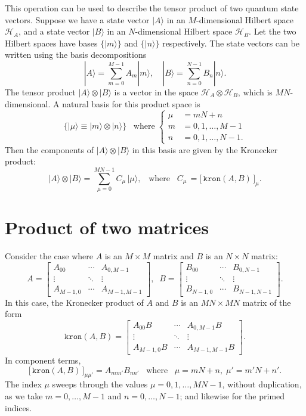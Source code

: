 \documentclass[pra,12pt]{revtex4}
\begin{document}
This operation can be used to describe the tensor product of two
quantum state vectors.  Suppose we have a state vector $|A\rangle$ in
an $M$-dimensional Hilbert space $\mathscr{H}_A$, and a state vector
$|B\rangle$ in an $N$-dimensional Hilbert space $\mathscr{H}_B$.  Let
the two Hilbert spaces have bases $\{|m\rangle\}$ and $\{|n\rangle\}$
respectively.  The state vectors can be written using the basis
decompositions
$$|A\rangle = \sum_{m=0}^{M-1} A_m |m\rangle, \quad |B\rangle = \sum_{n=0}^{N-1} B_n |n\rangle.$$
The tensor product $|A\rangle\otimes|B\rangle$ is a vector in the
space $\mathscr{H}_A\otimes \mathscr{H}_B$, which is $MN$-dimensional.
A natural basis for this product space is
$$\Big\{|\mu\rangle \equiv |m\rangle\otimes |n\rangle\Big\} \;\;\;\mathrm{where} \;\begin{cases}\mu\!\!\!\! &= mN+n \\ m \!\!\!\!&= 0,1,\dots,M-1 \\ n \!\!\!\!&= 0,1, \dots, N-1.\end{cases}$$
Then the components of $|A\rangle\otimes|B\rangle$ in this basis are
given by the Kronecker product:
$$|A\rangle\otimes|B\rangle = \sum_{\mu=0}^{MN-1} C_\mu \, |\mu\rangle, \;\;\; \mathrm{where}\;\;\; C_\mu\, = \big[\,\texttt{kron}(A,B)\,\big]_\mu.$$

\section{Product of two matrices}

Consider the case where $A$ is an $M\times M$ matrix and $B$ is an
$N\times N$ matrix:
$$A = \begin{bmatrix}A_{00} & \cdots & A_{0,M-1} \\ \vdots & \ddots & \vdots \\ A_{M-1,0} & \cdots & A_{M-1,M-1} \end{bmatrix}, \;\; B = \begin{bmatrix}B_{00} & \cdots & B_{0,N-1} \\ \vdots & \ddots & \vdots \\  B_{N-1,0} & \cdots & B_{N-1,N-1} \end{bmatrix}.$$
In this case, the Kronecker product of $A$ and $B$ is an $MN\times MN$
matrix of the form
$$\texttt{kron}(A,B) = \begin{bmatrix} A_{00}B & \cdots & A_{0,M-1}B \\ \vdots & \ddots & \vdots \\ A_{M-1,0}B & \cdots & A_{M-1,M-1}B\end{bmatrix}.$$
In component terms,
$$\big[\,\texttt{kron}(A,B)\,\big]_{\mu\mu'} = A_{mm'} B_{nn'}\;\;\;\mathrm{where}\;\;\;\mu = mN+n, \; \mu' = m'N+n'.$$
The index $\mu$ sweeps through the values $\mu = 0,1,\dots,MN-1$,
without duplication, as we take $m = 0,\dots,M-1$ and $n =
0,\dots,N-1$; and likewise for the primed indices.
\end{document}
